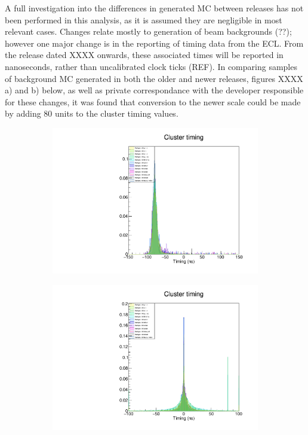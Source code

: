 \documentclass[12pt]{thesis}  %
\begin{document}
A full investigation into the differences in generated MC between releases has not been performed in this analysis, as it is assumed they are negligible in most relevant cases. Changes relate mostly to generation of beam backgrounds (??); however one major change is in the reporting of timing data from the ECL. From the release dated XXXX onwards, these associated times will be reported in nanoseconds, rather than uncalibrated clock ticks (REF). In comparing samples of background MC generated in both the older and newer releases, figures XXXX a) and b) below, as well as private correspondance with the developer responsible for these changes, it was found that conversion to the newer scale could be made by adding 80 units to the cluster timing values.

   \begin{figure}[h]
        \centering
        \begin{subfigure}[b]{0.475\textwidth}
            \centering
            \includegraphics[width=\textwidth]{images/cluster-timing-old.pdf}
            \caption[Network2]%
            {{\small}}    
            \label{fig:mean and std of net14}
        \end{subfigure}
        \hfill
        \begin{subfigure}[b]{0.475\textwidth}  
            \centering 
            \includegraphics[width=\textwidth]{images/cluster-timing-new.pdf}

\end{subfigure}
\end{figure}
\end{document}
